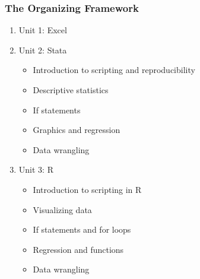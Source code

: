 \documentclass[11pt]{beamer}
\begin{document}
\begin{frame}\frametitle{The Organizing Framework}
\begin{enumerate}
\item<1-> Unit 1: \alert{Excel}
\pause
\item<1-> Unit 2: \alert{Stata}
\begin{itemize}
\item Introduction to scripting and reproducibility
\item Descriptive statistics
\item If statements 
\item Graphics and regression 
\item Data wrangling
\end{itemize}
\pause
\item<1-> Unit 3: \alert{R}
\begin{itemize}
\item Introduction to scripting in R
\item Visualizing data 
\item If statements and for loops 
\item Regression and functions
\item Data wrangling
\end{itemize}
\end{enumerate}
\end{frame}
\end{document}

